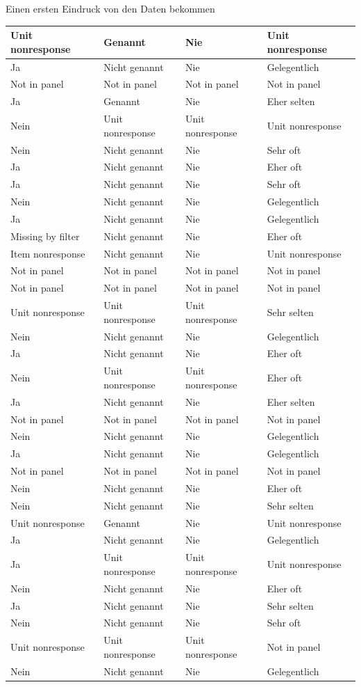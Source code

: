 \documentclass[ignorenonframetext,]{beamer}
\begin{document}
\begin{frame}{Einen ersten Eindruck von den Daten bekommen}
\begin{tabular}{l|l|l|l}
\hline
Unit nonresponse & Genannt & Nie & Unit nonresponse\\
\hline
Ja & Nicht genannt & Nie & Gelegentlich\\
\hline
Not in panel & Not in panel & Not in panel & Not in panel\\
\hline
Ja & Genannt & Nie & Eher selten\\
\hline
Nein & Unit nonresponse & Unit nonresponse & Unit nonresponse\\
\hline
Nein & Nicht genannt & Nie & Sehr oft\\
\hline
Ja & Nicht genannt & Nie & Eher oft\\
\hline
Ja & Nicht genannt & Nie & Sehr oft\\
\hline
Nein & Nicht genannt & Nie & Gelegentlich\\
\hline
Ja & Nicht genannt & Nie & Gelegentlich\\
\hline
Missing by filter & Nicht genannt & Nie & Eher oft\\
\hline
Item nonresponse & Nicht genannt & Nie & Unit nonresponse\\
\hline
Not in panel & Not in panel & Not in panel & Not in panel\\
\hline
Not in panel & Not in panel & Not in panel & Not in panel\\
\hline
Unit nonresponse & Unit nonresponse & Unit nonresponse & Sehr selten\\
\hline
Nein & Nicht genannt & Nie & Gelegentlich\\
\hline
Ja & Nicht genannt & Nie & Eher oft\\
\hline
Nein & Unit nonresponse & Unit nonresponse & Eher oft\\
\hline
Ja & Nicht genannt & Nie & Eher selten\\
\hline
Not in panel & Not in panel & Not in panel & Not in panel\\
\hline
Nein & Nicht genannt & Nie & Gelegentlich\\
\hline
Ja & Nicht genannt & Nie & Gelegentlich\\
\hline
Not in panel & Not in panel & Not in panel & Not in panel\\
\hline
Nein & Nicht genannt & Nie & Eher oft\\
\hline
Nein & Nicht genannt & Nie & Sehr selten\\
\hline
Unit nonresponse & Genannt & Nie & Unit nonresponse\\
\hline
Ja & Nicht genannt & Nie & Gelegentlich\\
\hline
Ja & Unit nonresponse & Unit nonresponse & Unit nonresponse\\
\hline
Nein & Nicht genannt & Nie & Eher oft\\
\hline
Ja & Nicht genannt & Nie & Sehr selten\\
\hline
Nein & Nicht genannt & Nie & Sehr oft\\
\hline
Unit nonresponse & Unit nonresponse & Unit nonresponse & Not in panel\\
\hline
Nein & Nicht genannt & Nie & Gelegentlich\\
\hline
\end{tabular}


\end{frame}
\end{document}
